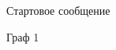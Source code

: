 \documentclass[otchet]{SCWorks}
\begin{document}
\begin{figure}[H]
	\caption{Стартовое сообщение}
	\label{pic1_1}
\end{figure}

\begin{figure}[H]
	\caption{Граф 1}
	\label{gr1_1}
\end{figure}
\end{document}
